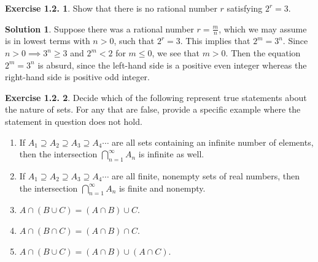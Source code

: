 \documentclass[12pt]{article}
\theoremstyle{definition}
\theoremstyle{exercise}
\newtheorem{exercise}{Exercise 1.2.}
\theoremstyle{solution}
\newtheorem*{solution}{Solution}
\begin{document}
\begin{exercise}
\label{ex:2}
    Show that there is no rational number \( r \) satisfying \( 2^r = 3 \).
\end{exercise}

\begin{solution}
    Suppose there was a rational number \( r = \tfrac{m}{n} \), which we may assume is in lowest terms with \( n > 0 \), such that \( 2^r = 3 \). This implies that \( 2^m = 3^n \). Since \( n > 0 \implies 3^n \geq 3 \) and \( 2^m < 2 \) for \( m \leq 0 \), we see that \( m > 0 \). Then the equation \( 2^m = 3^n \) is absurd, since the left-hand side is a positive even integer whereas the right-hand side is positive odd integer.
\end{solution}

\begin{exercise}
\label{ex:3}
    Decide which of the following represent true statements about the nature of sets. For any that are false, provide a specific example where the statement in question does not hold.
    \begin{enumerate}[label = (\alph*)]
        \item If \( A_1 \supseteq A_2 \supseteq A_3 \supseteq A_4 \cdots \) are all sets containing an infinite number of elements, then the intersection \( \bigcap_{n=1}^{\infty} A_n \) is infinite as well.

        \item If \( A_1 \supseteq A_2 \supseteq A_3 \supseteq A_4 \cdots \) are all finite, nonempty sets of real numbers, then the intersection \( \bigcap_{n=1}^{\infty} A_n \) is finite and nonempty.

        \item \( A \cap (B \cup C) = (A \cap B) \cup C \).

        \item \( A \cap (B \cap C) = (A \cap B) \cap C \).

        \item \( A \cap (B \cup C) = (A \cap B) \cup (A \cap C) \).
    \end{enumerate}
\end{exercise}
\end{document}
